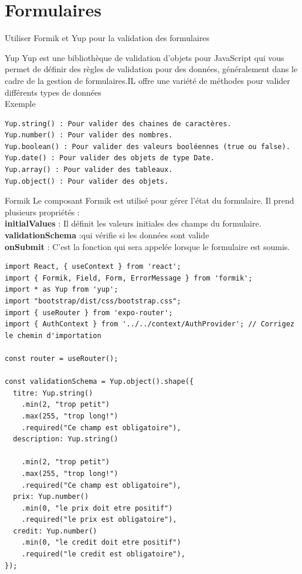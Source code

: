 \documentclass[5pt]{beamer}
\begin{document}
{\section{Formulaires}
\begin{frame}[fragile]{Utiliser Formik et Yup pour la validation des formulaires}
\begin{block}{Yup }
Yup est une bibliothèque de validation d’objets pour JavaScript qui vous permet de définir des règles de validation pour des données,
généralement dans le cadre de la gestion de formulaires.IL offre
une variété de méthodes pour valider différents types de données \\
Exemple
\begin{verbatim}
Yup.string() : Pour valider des chaines de caractères.
Yup.number() : Pour valider des nombres.
Yup.boolean() : Pour valider des valeurs booléennes (true ou false).
Yup.date() : Pour valider des objets de type Date.
Yup.array() : Pour valider des tableaux.
Yup.object() : Pour valider des objets.
\end{verbatim}
\end{block}
\end{frame}
\begin{block}{Formik }
Le composant Formik est utilisé pour gérer l’état du formulaire. Il prend plusieurs propriétés :\\
\textbf{initialValues} : Il définit les valeurs initiales des champs du
formulaire.\\
\textbf{validationSchema} :qui vérifie si les données sont valide\\
\textbf{onSubmit} : C’est la fonction qui sera appelée lorsque le formulaire est soumis.\\
\end{block}

\begin{verbatim}
import React, { useContext } from 'react';
import { Formik, Field, Form, ErrorMessage } from 'formik';
import * as Yup from 'yup';
import "bootstrap/dist/css/bootstrap.css";
import { useRouter } from 'expo-router';
import { AuthContext } from '../../context/AuthProvider'; // Corrigez le chemin d'importation

const router = useRouter();

const validationSchema = Yup.object().shape({
  titre: Yup.string()
    .min(2, "trop petit")
    .max(255, "trop long!")
    .required("Ce champ est obligatoire"),
  description: Yup.string()
  
    .min(2, "trop petit")
    .max(255, "trop long!")
    .required("Ce champ est obligatoire"),
  prix: Yup.number()
    .min(0, "le prix doit etre positif")
    .required("le prix est obligatoire"),
  credit: Yup.number()
    .min(0, "le credit doit etre positif")
    .required("le credit est obligatoire"),
});


\end{verbatim}}
\end{document}
